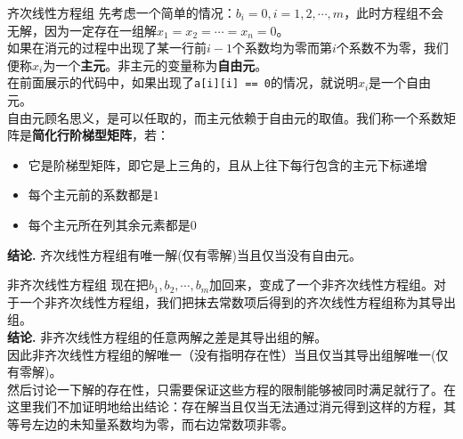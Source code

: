 \documentclass{beamer}
\begin{document}
\begin{frame}{齐次线性方程组}
	先考虑一个简单的情况：$b_i = 0, i = 1, 2, \cdots, m$，此时方程组不会无解，因为一定存在一组解$x_1 = x_2 = \cdots = x_n = 0$。\\
	
	如果在消元的过程中出现了某一行前$i-1$个系数均为零而第$i$个系数不为零，我们便称$x_i$为一个\textbf{主元}。非主元的变量称为\textbf{自由元}。\\
	
	在前面展示的代码中，如果出现了\texttt{a[i][i] == 0}的情况，就说明$x_i$是一个自由元。\\
	
	自由元顾名思义，是可以任取的，而主元依赖于自由元的取值。我们称一个系数矩阵是\textbf{简化行阶梯型矩阵}，若：
	\begin{itemize}
		\item 它是阶梯型矩阵，即它是上三角的，且从上往下每行包含的主元下标递增
		\item 每个主元前的系数都是$1$
		\item 每个主元所在列其余元素都是$0$
	\end{itemize}

	\textbf{结论. }齐次线性方程组有唯一解(仅有零解)当且仅当没有自由元。
\end{frame}

\begin{frame}{非齐次线性方程组}
	现在把$b_1, b_2, \cdots, b_m$加回来，变成了一个非齐次线性方程组。对于一个非齐次线性方程组，我们把抹去常数项后得到的齐次线性方程组称为其导出组。\\
	
	\textbf{结论. }非齐次线性方程组的任意两解之差是其导出组的解。\\
	
	因此非齐次线性方程组的解唯一（没有指明存在性）当且仅当其导出组解唯一(仅有零解)。\\
	
	然后讨论一下解的存在性，只需要保证这些方程的限制能够被同时满足就行了。在这里我们不加证明地给出结论：存在解当且仅当无法通过消元得到这样的方程，其等号左边的未知量系数均为零，而右边常数项非零。
	
\end{frame}
\end{document}
